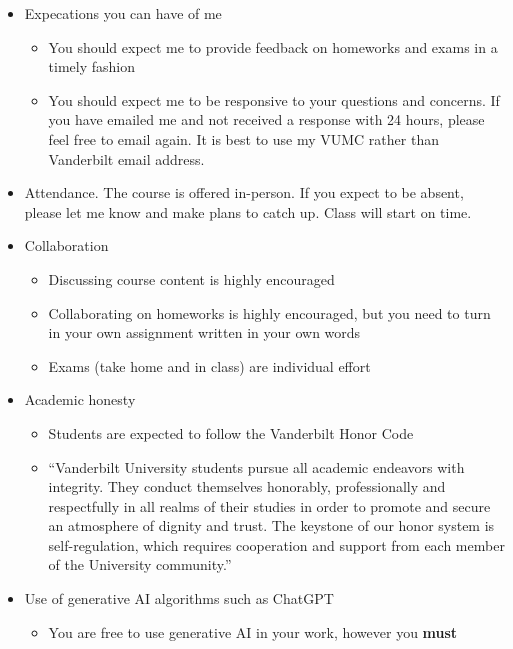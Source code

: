 \documentclass[
  letterpaper,
  DIV=11,
  numbers=noendperiod]{scrartcl}
\begin{document}
\begin{itemize}
\item
  Expecations you can have of me

  \begin{itemize}
  \item
    You should expect me to provide feedback on homeworks and exams in a
    timely fashion
  \item
    You should expect me to be responsive to your questions and
    concerns. If you have emailed me and not received a response with 24
    hours, please feel free to email again. It is best to use my VUMC
    rather than Vanderbilt email address.
  \end{itemize}
\item
  Attendance. The course is offered in-person. If you expect to be
  absent, please let me know and make plans to catch up. Class will
  start on time.
\item
  Collaboration

  \begin{itemize}
  \item
    Discussing course content is highly encouraged
  \item
    Collaborating on homeworks is highly encouraged, but you need to
    turn in your own assignment written in your own words
  \item
    Exams (take home and in class) are individual effort
  \end{itemize}
\item
  Academic honesty

  \begin{itemize}
  \item
    Students are expected to follow the Vanderbilt Honor Code
  \item
    ``Vanderbilt University students pursue all academic endeavors with
    integrity. They conduct themselves honorably, professionally and
    respectfully in all realms of their studies in order to promote and
    secure an atmosphere of dignity and trust. The keystone of our honor
    system is self-regulation, which requires cooperation and support
    from each member of the University community.''
  \end{itemize}
\item
  Use of generative AI algorithms such as ChatGPT

  \begin{itemize}
  \item
    You are free to use generative AI in your work, however you
    \textbf{must}


\end{itemize}
\end{itemize}
\end{document}
